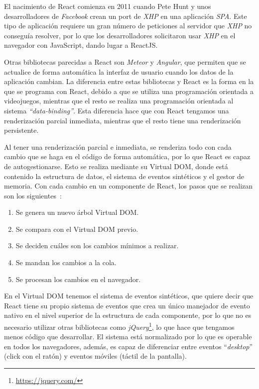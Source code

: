 \documentclass[a4paper, 12pt]{book}
\begin{document}
\vspace{5mm}
El nacimiento de React comienza en 2011 cuando Pete Hunt y unos desarrolladores de \textit{Facebook} crean un port de \textit{XHP} en una aplicación \textit{SPA}. Este tipo de aplicación requiere un gran número de peticiones al servidor que \textit{XHP} no conseguía resolver, por lo que los desarrolladores solicitaron usar \textit{XHP} en el navegador con JavaScript, dando lugar a ReactJS.

\vspace{5mm}
Otras bibliotecas parecidas a React son \textit{Meteor} y \textit{Angular}, que permiten que se actualice de forma automática la interfaz de usuario cuando los datos de la aplicación cambian. La diferencia entre estas bibliotecas y React es la forma en la que se programa con React, debido a que se utiliza una programación orientada a videojuegos, mientras que el resto se realiza una programación orientada al sistema \textit{“data-binding”}. Esta diferencia hace que con React tengamos una renderización parcial inmediata, mientras que el resto tiene una renderización persistente. 

Al tener una renderización parcial e inmediata, se renderiza todo con cada cambio que se haga en el código de forma automática, por lo que React es capaz de autogestionarse. Esto se realiza mediante su Virtual DOM, donde está contenido la estructura de datos, el sistema de eventos sintéticos y el gestor de memoria. Con cada cambio en un componente de React, los pasos que se realizan son los siguientes~\cite{react_book}:

\begin{enumerate}
\item Se genera un nuevo árbol Virtual DOM.
\item Se compara con el Virtual DOM previo.
\item Se deciden cuáles son los cambios mínimos a realizar.
\item Se mandan los cambios a la cola.
\item Se procesan los cambios en el navegador.
\end{enumerate}

\vspace{5mm}
En el Virtual DOM tenemos el sistema de eventos sintéticos, que quiere decir que React tiene su propio sistema de eventos que crea un único manejador de evento nativo en el nivel superior de la estructura de cada componente, por lo que no es necesario utilizar otras bibliotecas como \textit{jQuery}\footnote{\url{https://jquery.com/}}, lo que hace que tengamos menos código que desarrollar. El sistema está normalizado por lo que es operable en todos los navegadores, además, es capaz de diferenciar entre eventos “\textit{desktop}” (click con el ratón) y eventos móviles (táctil de la pantalla). 
\end{document}
